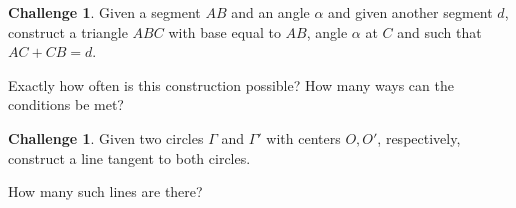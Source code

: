 \documentclass{tufte-handout}
\theoremstyle{definition}
\newtheorem{challenge}[problem]{Challenge}
\begin{document}
\begin{challenge}\label{chal:triangle-problem}
Given a segment $AB$ and an angle $\alpha$ and given another segment $d$, construct a triangle $ABC$ with base equal to $AB$, angle $\alpha$ at $C$ and such that $AC + CB = d$.

Exactly how often is this construction possible? How many ways can the conditions be met?
\end{challenge}


\begin{challenge}\label{chal:double-tangent}
Given two circles $\Gamma$ and $\Gamma'$ with centers $O, O'$, respectively, construct a line tangent to both circles.

How many such lines are there?
\end{challenge}


\vfill
\end{document}
